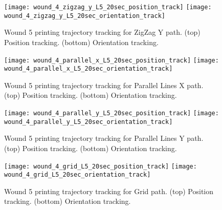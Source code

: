 \begin{figure}[htbp]
	\centering
	\texttt{[image: wound\_4\_zigzag\_y\_L5\_20sec\_position\_track]}
	\texttt{[image: wound\_4\_zigzag\_y\_L5\_20sec\_orientation\_track]}
\caption[Wound 5 printing trajectory tracking for ZigZag Y path.]{Wound 5 printing trajectory tracking for ZigZag Y path. (top) Position tracking. (bottom) Orientation tracking.}
	\label{fig:simulation_test_results_appendix_trajectory_tracking_wound_5_zizzag_y_tracking}
\end{figure}


\begin{figure}[htbp]
	\centering
	\texttt{[image: wound\_4\_parallel\_x\_L5\_20sec\_position\_track]}
	\texttt{[image: wound\_4\_parallel\_x\_L5\_20sec\_orientation\_track]}
	\caption[Wound 5 printing trajectory tracking for Parallel Lines X path.]{Wound 5 printing trajectory tracking for Parallel Lines X path. (top) Position tracking. (bottom) Orientation tracking.}
	\label{fig:simulation_test_results_appendix_trajectory_tracking_wound_5_parallel_x_tracking}
\end{figure}

\begin{figure}[htbp]
	\centering
	\texttt{[image: wound\_4\_parallel\_y\_L5\_20sec\_position\_track]}
	\texttt{[image: wound\_4\_parallel\_y\_L5\_20sec\_orientation\_track]}
    \caption[Wound 5 printing trajectory tracking for Parallel Lines Y path.]{Wound 5 printing trajectory tracking for Parallel Lines Y path. (top) Position tracking. (bottom) Orientation tracking.}
	\label{fig:simulation_test_results_appendix_trajectory_tracking_wound_5_parallel_y_tracking}
\end{figure}

\begin{figure}[htbp]
	\centering
	\texttt{[image: wound\_4\_grid\_L5\_20sec\_position\_track]}
	\texttt{[image: wound\_4\_grid\_L5\_20sec\_orientation\_track]}
    \caption[Wound 5 printing trajectory tracking for Grid path.]{Wound 5 printing trajectory tracking for Grid path. (top) Position tracking. (bottom) Orientation tracking.}
	\label{fig:simulation_test_results_appendix_trajectory_tracking_wound_5_grid_tracking}
\end{figure}

